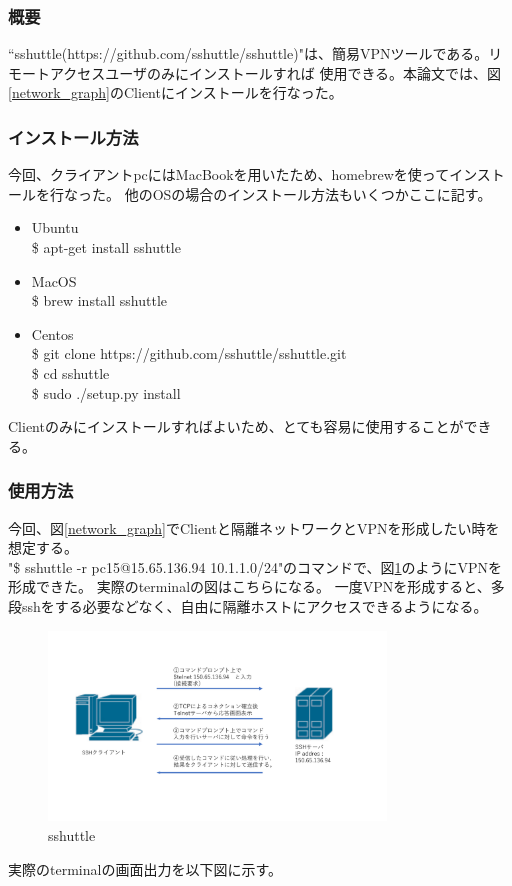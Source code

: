 \documentclass[12pt,a4paper,titlepage]{jsarticle}
\begin{document}
\subsubsection*{概要}
``sshuttle(https://github.com/sshuttle/sshuttle)"は、簡易VPNツールである。リモートアクセスユーザのみにインストールすれば
    使用できる。本論文では、図\ref{network_graph}のClientにインストールを行なった。
\subsubsection*{インストール方法}
今回、クライアントpcにはMacBookを用いたため、homebrewを使ってインストールを行なった。
他のOSの場合のインストール方法もいくつかここに記す。
\begin{itemize}
    \item Ubuntu \mbox{}\\ \$ apt-get install sshuttle
    \item MacOS \mbox{}\\ \$ brew install sshuttle
    \item Centos \mbox{}\\  \$ git clone https://github.com/sshuttle/sshuttle.git\\\$ cd sshuttle \\ \$ sudo ./setup.py install 
\end{itemize}
Clientのみにインストールすればよいため、とても容易に使用することができる。

\subsubsection*{使用方法}
今回、図\ref{network_graph}でClientと隔離ネットワークとVPNを形成したい時を想定する。\\
"\$ sshuttle -r pc15@15.65.136.94 10.1.1.0/24"のコマンドで、図\ref{sshuttle}のようにVPNを形成できた。
実際のterminalの図はこちらになる。
一度VPNを形成すると、多段sshをする必要などなく、自由に隔離ホストにアクセスできるようになる。



\begin{figure}[h]
    \centering
    \includegraphics[width=0.8\textwidth, page=7]{graphs/network_archtecture.pdf}
    \caption{sshuttle}
    \label{sshuttle}
\end{figure}
実際のterminalの画面出力を以下図に示す。
\end{document}
